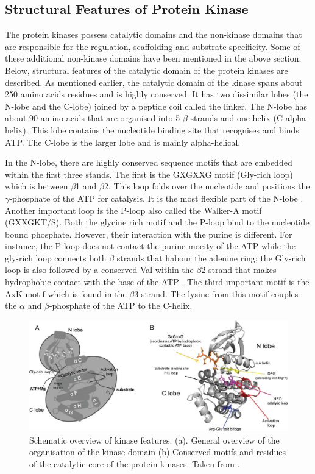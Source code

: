 \documentclass[a4paper, 11pt]{report}
\begin{document}
\subsection{Structural Features of Protein Kinase}
The protein kinases possess catalytic domains and the non-kinase domains that are responsible for the regulation, scaffolding and substrate specificity. Some of these additional non-kinase domains have been mentioned in the above section. Below, structural features of the catalytic domain of the protein kinases are described. As mentioned earlier, the catalytic domain of the kinase spans about 250 amino acids residues and is highly conserved. It has two dissimilar lobes (the N-lobe and the C-lobe) joined by a peptide coil called the linker. The N-lobe has about 90 amino acids that are organised into 5 $\beta$-strands and one helix (C-alpha-helix). This lobe contains the nucleotide binding site that recognises and binds ATP. The C-lobe is the larger lobe and is mainly alpha-helical.\par
In the N-lobe, there are highly conserved sequence motifs that are embedded within the first three stands. The first is the GXGXXG motif (Gly-rich loop) which is between $\beta$1 and $\beta$2. This loop folds over the nucleotide and positions the  $\gamma$-phosphate of the ATP for catalysis. It is the most flexible part of the N-lobe \cite{taylor2011protein}. Another important loop is the P-loop also called the Walker-A motif (GXXGKT/S). Both the glycine rich motif and the P-loop bind to the nucleotide bound phosphate. However, their interaction with the purine is different. For instance, the P-loop does not contact the purine moeity of the ATP while the gly-rich loop connects both $\beta$ strands that habour the adenine ring; the Gly-rich loop is also followed by a conserved Val within the $\beta$2 strand that makes hydrophobic contact with the base of the ATP \cite{fabbro2015ten}. The third important motif is the AxK motif which is found in the $\beta$3 strand. The lysine from this motif couples the $\alpha$ and $\beta$-phosphate of the ATP to the C-helix. \\
\begin{figure}[H]
	\includegraphics[width=\linewidth]{figures/kinasedom.jpg}
	\centering
	\caption{Schematic overview of kinase features. (a). General overview of the organisation of the kinase domain (b) Conserved motifs and residues of the catalytic core of the protein kinases. Taken from \cite{lorenzen2014hdx}.}
	\label{kinasedoms}
\end{figure}
\end{document}
